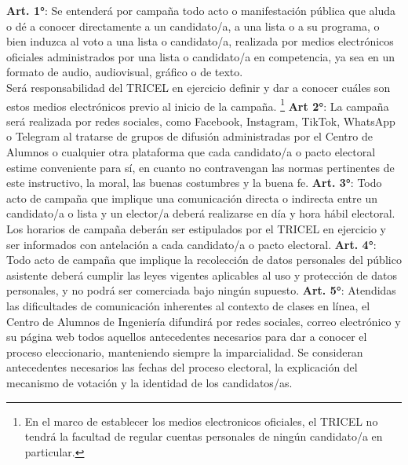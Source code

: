 \documentclass{caitemplate}
\begin{document}

\textbf{Art. 1°}: Se entenderá por campaña todo acto o manifestación pública que aluda o dé a conocer directamente a un candidato/a, a una lista o a su programa, o bien induzca al voto a una lista o candidato/a, realizada por medios electrónicos oficiales administrados por una lista o candidato/a en competencia, ya sea en un formato de audio, audiovisual, gráfico o de texto.\\

Será responsabilidad del TRICEL en ejercicio definir y dar a conocer cuáles son estos medios electrónicos previo al inicio de la campaña. \footnote{En el marco de establecer los medios electronicos oficiales, el TRICEL no tendrá la facultad de regular cuentas personales de ningún candidato/a en particular.}
\newline
\newline
\textbf{Art 2°}: La campaña será realizada por redes sociales, como Facebook, Instagram, TikTok, WhatsApp o Telegram al tratarse de grupos de difusión administradas por el Centro de Alumnos o cualquier otra plataforma que cada candidato/a o pacto electoral estime conveniente para sí, en cuanto no contravengan las normas pertinentes de este instructivo, la moral, las buenas costumbres y la buena fe.
\newline
\newline
\textbf{Art. 3°}: Todo acto de campaña que implique una comunicación directa o indirecta entre un candidato/a o lista y un elector/a deberá realizarse en día y hora hábil electoral.\\

Los horarios de campaña deberán ser estipulados por el TRICEL en ejercicio y ser informados con antelación a cada candidato/a o pacto electoral.
\newline
\newline
\textbf{Art. 4°}: Todo acto de campaña que implique la recolección de datos personales del público asistente deberá cumplir las leyes vigentes aplicables al uso y protección de datos personales, y no podrá ser comerciada bajo ningún supuesto.
\newline
\newline
\textbf{Art. 5°}: Atendidas las dificultades de comunicación inherentes al contexto de clases en línea, el Centro de Alumnos de Ingeniería difundirá por redes sociales, correo electrónico y su página web todos aquellos antecedentes necesarios para dar a conocer el proceso eleccionario, manteniendo siempre la imparcialidad. Se consideran antecedentes necesarios las fechas del proceso electoral, la explicación del mecanismo de votación y la identidad de los candidatos/as.\\
\end{document}
